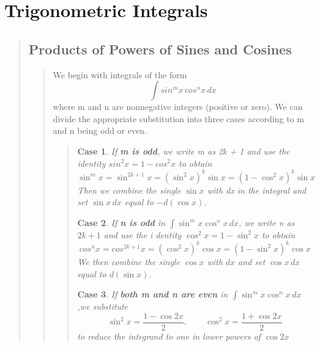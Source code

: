 \documentclass{report}
\newtheorem{case}{Case}
\begin{document}

\section{Trigonometric Integrals}
\begin{quote}

	\subsection{Products of Powers of Sines and Cosines}
	\begin{quote}

		We begin with integrals of the form 
		$$\int sin^m x\,cos^n x\, dx$$
		where m and n are nonnegative integers (positive or zero). We can divide the appropriate substitution into three cases according to m and n being odd or even.

		\begin{quote}

			\begin{case}
				If \textbf{m is odd}, we write m as 2k + 1 and use the identity $sin^2x = 1 - cos^2x$ to obtain 
				$$\sin^m x= \sin^{2k+1}x = (\sin^2x)^k \sin x = (1-\cos^2x)^k \sin x$$
				Then we combine the single $\sin x$ with dx in the integral and set $\sin x \,dx$ equal to $-d(\cos x)$.
			\end{case}

			\begin{case}
				If \textbf{n is odd} in $\int \sin^m x \cos^n x\, dx$, we write n as $2k + 1$ and use the i dentity $\cos^2x = 1 - \sin^2 x$ to obtain
				$$cos^nx=cos^{2k+1}x=(\cos^2x)^k \cos x =(1-\sin^2x)^k \cos x$$
				We then combine the single $\cos x$ with $dx$ and set $\cos x \, dx$ equal to $d(\sin x)$.
			\end{case}

			\begin{case}
				If \textbf{both m and n are even} in $\int \sin^m x \cos ^n x \, dx$,we substitute
				$$\sin^2x=\frac{1-\cos 2x}{2},\qquad \cos^2x = \frac{1+\cos 2x}{2}$$
				to reduce the integrand to one in lower powers of $\cos 2x$
			\end{case}

		\end{quote}

	\end{quote}


\end{quote}
\end{document}
